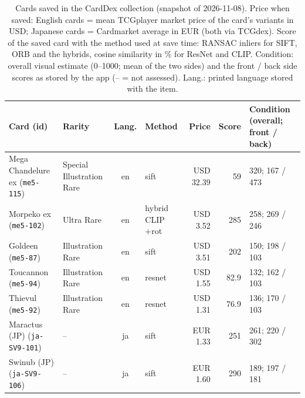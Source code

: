 \begin{table}[htbp]\centering\footnotesize
\caption[Cards saved in the application]{Cards saved in the CardDex collection (snapshot of 2026-11-08). Price when saved: English cards = mean TCGplayer market price of the card's variants in USD; Japanese cards = Cardmarket average in EUR (both via TCGdex). Score of the saved card with the method used at save time: RANSAC inliers for SIFT, ORB and the hybrids, cosine similarity in \% for ResNet and CLIP. Condition: overall visual estimate (0--1000; mean of the two sides) and the front / back side scores as stored by the app (-- = not assessed). Lang.: printed language stored with the item.}\label{tab:app-collection}
\begin{tabular}{@{}P{1.45in}P{1.05in}cP{0.6in}rrP{1.15in}@{}}
\toprule
Card (id) & Rarity & Lang. & Method & Price & Score & Condition (overall; front / back)\\
\midrule
Mega Chandelure ex (\texttt{me5-115}) & Special Illustration Rare & en & sift & USD 32.39 & 59 & 320; 167 / 473\\
Morpeko ex (\texttt{me5-102}) & Ultra Rare & en & hybrid CLIP +rot & USD 3.52 & 285 & 258; 269 / 246\\
Goldeen (\texttt{me5-87}) & Illustration Rare & en & sift & USD 3.51 & 202 & 150; 198 / 103\\
Toucannon (\texttt{me5-94}) & Illustration Rare & en & resnet & USD 1.55 & 82.9 & 132; 162 / 103\\
Thievul (\texttt{me5-92}) & Illustration Rare & en & resnet & USD 1.31 & 76.9 & 136; 170 / 103\\
Maractus (JP) (\texttt{ja-SV9-101}) & -- & ja & sift & EUR 1.33 & 251 & 261; 220 / 302\\
Swinub (JP) (\texttt{ja-SV9-106}) & -- & ja & sift & EUR 1.60 & 290 & 189; 197 / 181\\
\bottomrule
\end{tabular}
\end{table}
